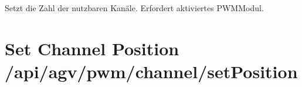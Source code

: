 \documentclass[letterpaper,10pt,english]{sphinxmanual}
\begin{document}
\sphinxAtStartPar
{}
Setzt die Zahl der nutzbaren Kanäle. Erfordert aktiviertes PWM\sphinxhyphen{}Modul.

\sphinxAtStartPar
{}

\begin{sphinxVerbatim}[commandchars=\\\{\}]
\end{sphinxVerbatim}

\sphinxAtStartPar
{}

\begin{sphinxVerbatim}[commandchars=\\\{\}]
\end{sphinxVerbatim}


\section{Set Channel Position \textendash{} /api/agv/pwm/channel/setPosition}
\label{\detokenize{agv_rest_api_pwm:set-channel-position-api-agv-pwm-channel-setposition}}\label{\detokenize{agv_rest_api_pwm:post-api-agv-pwm-channel-setposition}}
\end{document}
